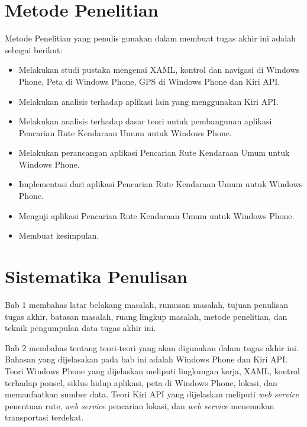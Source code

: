 \section{Metode Penelitian}
\label{sec:metode_penelitian}
Metode Penelitian yang penulis gunakan dalam membuat tugas akhir ini adalah sebagai berikut:
\begin{itemize}
	\item Melakukan studi pustaka mengenai XAML, kontrol dan navigasi di Windows Phone, Peta di Windows Phone, GPS di Windows Phone dan Kiri API.
	\item Melakukan analisis terhadap aplikasi lain yang menggunakan Kiri API.
	\item Melakukan analisis terhadap dasar teori untuk pembangunan aplikasi Pencarian Rute Kendaraan Umum untuk Windows Phone.
	\item Melakukan perancangan aplikasi Pencarian Rute Kendaraan Umum untuk Windows Phone.
	\item Implementasi dari aplikasi Pencarian Rute Kendaraan Umum untuk Windows Phone.
	\item Menguji aplikasi Pencarian Rute Kendaraan Umum untuk Windows Phone.
	\item Membuat kesimpulan.
\end{itemize}


\section{Sistematika Penulisan}
\label{sec:sistematika_penulisan}
\hspace{0.5cm} Bab 1 membahas latar belakang masalah, rumusan masalah, tujuan penulisan tugas akhir, batasan masalah, ruang lingkup masalah, metode penelitian, dan teknik pengumpulan data tugas akhir ini.

Bab 2 membahas tentang teori-teori yang akan digunakan dalam tugas akhir ini. Bahasan yang dijelasakan pada bab ini adalah Windows Phone dan Kiri API. Teori Windows Phone yang dijelaskan meliputi lingkungan kerja, XAML, kontrol terhadap ponsel, siklus hidup aplikasi, peta di Windows Phone, lokasi, dan memanfaatkan sumber data. Teori Kiri API yang dijelaskan meliputi \textit{web service} penentuan rute, \textit{web service} pencarian lokasi, dan \textit{web service} menemukan transportasi terdekat. 

